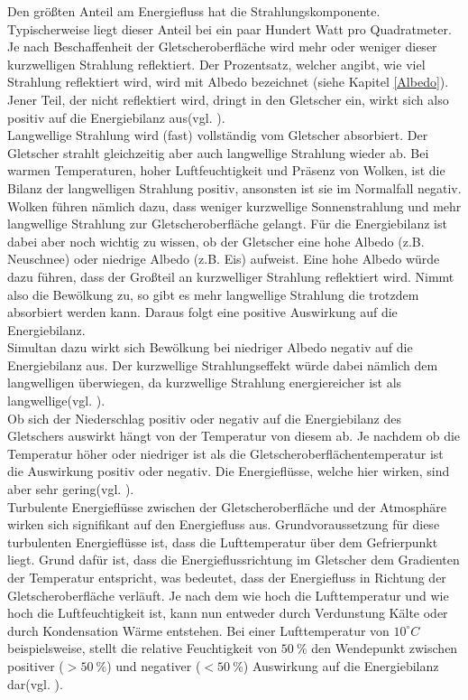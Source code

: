 \documentclass[11pt,a4paper]{article}
\begin{document}
Den größten Anteil am Energiefluss hat die Strahlungskomponente. Typischerweise liegt dieser Anteil bei ein paar Hundert Watt pro Quadratmeter. Je nach Beschaffenheit der Gletscheroberfläche wird mehr oder weniger dieser kurzwelligen Strahlung reflektiert. Der Prozentsatz, welcher angibt, wie viel Strahlung reflektiert wird, wird mit Albedo bezeichnet (siehe Kapitel \ref{Albedo}). Jener Teil, der nicht reflektiert wird, dringt in den Gletscher ein, wirkt sich also positiv auf die Energiebilanz aus(vgl. \cite[16]{Themicroclimateofvalleyglaciers}).\\

Langwellige Strahlung wird (fast) vollständig vom Gletscher absorbiert. Der Gletscher strahlt gleichzeitig aber auch langwellige Strahlung wieder ab. Bei warmen Temperaturen, hoher Luftfeuchtigkeit und Präsenz von Wolken, ist die Bilanz der langwelligen Strahlung positiv, ansonsten ist sie im Normalfall negativ.\\
Wolken führen nämlich dazu, dass weniger kurzwellige Sonnenstrahlung und mehr langwellige Strahlung zur Gletscheroberfläche gelangt. Für die Energiebilanz ist dabei aber noch wichtig zu wissen, ob der Gletscher eine hohe Albedo (z.B. Neuschnee) oder niedrige Albedo (z.B. Eis) aufweist. Eine hohe Albedo würde dazu führen, dass der Großteil an kurzwelliger Strahlung reflektiert wird. Nimmt also die Bewölkung zu, so gibt es mehr langwellige Strahlung die trotzdem absorbiert werden kann. Daraus folgt eine positive Auswirkung auf die Energiebilanz.\\
Simultan dazu wirkt sich Bewölkung bei niedriger Albedo negativ auf die Energiebilanz aus. Der kurzwellige Strahlungseffekt würde dabei nämlich dem langwelligen überwiegen, da kurzwellige Strahlung energiereicher ist als langwellige(vgl. \cite[16, 17]{Themicroclimateofvalleyglaciers}).\\

Ob sich der Niederschlag positiv oder negativ auf die Energiebilanz des Gletschers auswirkt hängt von der Temperatur von diesem ab. Je nachdem ob die Temperatur höher oder niedriger ist als die Gletscheroberflächentemperatur ist die Auswirkung positiv oder negativ. Die Energieflüsse, welche hier wirken, sind aber sehr gering(vgl. \cite[17]{Themicroclimateofvalleyglaciers}).\\

Turbulente Energieflüsse zwischen der Gletscheroberfläche und der Atmosphäre wirken sich signifikant auf den Energiefluss aus. Grundvoraussetzung für diese turbulenten Energieflüsse ist, dass die Lufttemperatur über dem Gefrierpunkt liegt. Grund dafür ist, dass die Energieflussrichtung im Gletscher dem Gradienten der Temperatur entspricht, was bedeutet, dass der Energiefluss in Richtung der Gletscheroberfläche verläuft. Je nach dem wie hoch die Lufttemperatur und wie hoch die Luftfeuchtigkeit ist, kann nun entweder durch Verdunstung Kälte oder durch Kondensation Wärme entstehen. Bei einer Lufttemperatur von $10^\circ C$ beispielsweise, stellt die relative Feuchtigkeit von $50~\%$ den Wendepunkt zwischen positiver ($>50~\%$) und negativer ($<50~\%$) Auswirkung auf die Energiebilanz dar(vgl. \cite[17]{Themicroclimateofvalleyglaciers}).\\
\end{document}
